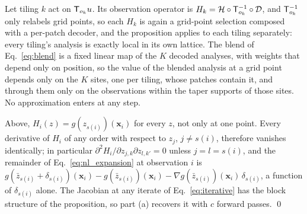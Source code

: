  Let tiling $k$ act on $\mathsf{T}_{o_k}u$. Its observation operator
is $H_k = \mathcal{H}\circ\mathsf{T}_{o_k}^{-1}\circ\mathcal{D}$, and $\mathsf{T}_{o_k}^{-1}$ only relabels grid points, so each $H_k$ is
again a grid-point selection composed with a per-patch decoder, and the proposition applies to
each tiling separately: every tiling's analysis is exactly local in its own lattice. The blend of
Eq.~\eqref{eq:blend} is a fixed linear map of the $K$ decoded analyses, with weights that depend only
on position, so the value of the blended analysis at a grid point depends only on the $K$ sites, one per
tiling, whose patches contain it, and through them only on the observations within the taper
supports of those sites. No approximation enters at any step.

 Above, $H_i(z)=g(z_{s(i)})(\bm x_i)$
for every $z$, not only at one point. Every derivative of $H_i$ of any order with
respect to $z_j$, $j\ne s(i)$, therefore vanishes identically; in particular
$\partial^2H_i/\partial z_{j,k}\partial z_{l,k'}=0$ unless $j=l=s(i)$, and the
remainder of Eq.~\eqref{eq:nl_expansion} at observation $i$ is
$g(\bar z_{s(i)}+\delta_{s(i)})(\bm x_i)-g(\bar z_{s(i)})(\bm x_i)-\nabla g(\bar z_{s(i)})(\bm x_i)\,\delta_{s(i)}$,
a function of $\delta_{s(i)}$ alone. The Jacobian at any iterate of
Eq.~\eqref{eq:iterative} has the block structure of the proposition, so part (a)
recovers it with $c$ forward passes. \qed
